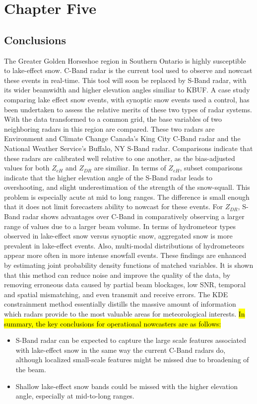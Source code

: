 \chapter{Chapter Five}
\section{Conclusions}
The Greater Golden Horseshoe region in Southern Ontario is highly susceptible to lake-effect snow. C-Band radar is the current tool used to observe and nowcast
these events in real-time. This tool will soon be replaced by S-Band radar, with its wider beamwidth and higher elevation angles similiar to KBUF. A case study comparing lake
effect snow events, with synoptic snow events used a control, has been undertaken to assess the relative merits of these two types of radar systems. With the
data transformed to a common grid, the base variables of two neighboring radars in this region are compared. These two radars are Environment and Climate
Change Canada's King City C-Band radar and the National Weather Service's Buffalo, NY S-Band radar. Comparisons indicate that these radars are calibrated well relative to one another, as the bias-adjusted values for both $Z_{eH}$ and $Z_{DR}$ are similiar. In terms of $Z_{eH}$, subset comparisons indicate that the higher elevation angle of the S-Band radar leads to overshooting, and slight underestimation of the strength of the snow-squall.  This problem is especially 
acute at mid to long ranges. The difference is small enough that it does not limit forecasters ability to nowcast for these events. For $Z_{DR}$, S-Band radar shows advantages over C-Band in comparatively observing a larger range of values due to a larger beam volume. In terms of hydrometeor types observed in lake-effect snow versus synoptic snow, aggregated snow is more prevalent in lake-effect events. Also, multi-modal distributions of hydrometeors appear more often in more intense snowfall events. These findings are enhanced by estimating joint probability density functions of matched variables. It is shown that this method can reduce noise and improve 
the quality of the data, by removing erroneous data caused by partial beam blockages, low SNR, temporal and spatial mismatching, and even transmit and receive errors. The KDE constrainment method essentially distills the massive amount of information which radars provide to the most valuable areas for meteorological interests. \hl{In summary, the key conclusions for operational nowcasters are as follows:}
\begin{itemize}
  \item S-Band radar can be expected to capture the large scale features associated with lake-effect snow in the same way the current C-Band radars do, although localized small-scale features might be missed due to broadening of the beam.
  \item Shallow lake-effect snow bands could be missed with the higher elevation angle, especially at mid-to-long ranges.
\end{itemize}